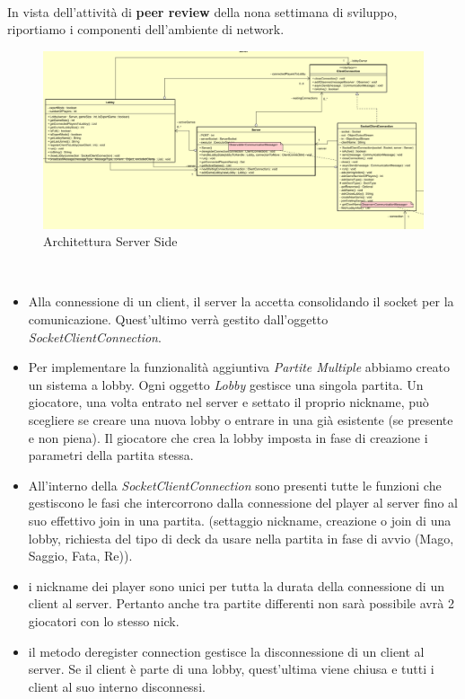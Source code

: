 \documentclass[a4paper, 12pt]{article}
\begin{document}
	\paragraph{}
	In vista dell'attività di \textbf{peer review} della nona settimana di sviluppo, riportiamo i componenti dell'ambiente di network.\\
	\begin{figure}[h!]
		\centering
		\includegraphics[scale=0.45]{serverSideArch.png}
		\caption{Architettura Server Side}
	\end{figure}\\
	\begin{itemize}
		\item Alla connessione di un client, il server la accetta consolidando il socket per la comunicazione. Quest'ultimo verrà gestito dall'oggetto \textit{SocketClientConnection}.
		\item Per implementare la funzionalità aggiuntiva \textit{Partite Multiple} abbiamo creato un sistema a lobby. Ogni oggetto \textit{Lobby} gestisce una singola partita. Un giocatore, una volta entrato nel server e settato il proprio nickname, può scegliere se creare una nuova lobby o entrare in una già esistente (se presente e non piena). Il giocatore che crea la lobby imposta in fase di creazione i parametri della partita stessa.
		\item All'interno della \textit{SocketClientConnection} sono presenti tutte le funzioni che gestiscono le fasi che intercorrono dalla connessione del player al server fino al suo effettivo join in una partita. (settaggio nickname, creazione o join di una lobby, richiesta del tipo di deck da usare nella partita in fase di avvio (Mago, Saggio, Fata, Re)).
		\item i nickname dei player sono unici per tutta la durata della connessione di un client al server. Pertanto anche tra partite differenti non sarà possibile avrà 2 giocatori con lo stesso nick.
		\item il metodo deregister connection gestisce la disconnessione di un client al server. Se il client è parte di una lobby, quest'ultima viene chiusa e tutti i client al suo interno disconnessi.
	\end{itemize}
	
\end{document}
